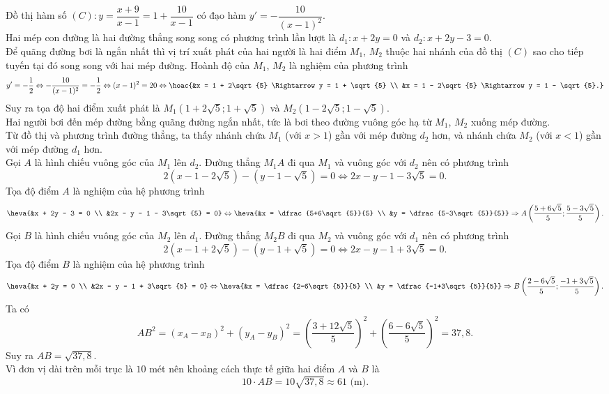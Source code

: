 \begin{ex}
{\begin{center}
\begin{tikzpicture}[>=stealth, line cap=round, line join=round, scale=0.6]
			\end{tikzpicture}
		\end{center}
		Đồ thị hàm số $(C)\colon y = \dfrac{x+9}{x-1} = 1 + \dfrac{10}{x-1}$ có đạo hàm $y' = -\dfrac{10}{(x-1)^2}$.\\
		Hai mép con đường là hai đường thẳng song song có phương trình lần lượt là $d_1\colon x+2y=0$ và $d_2\colon x+2y-3=0$.\\
		Để quãng đường bơi là ngắn nhất thì vị trí xuất phát của hai người là hai điểm $M_1$, $M_2$ thuộc hai nhánh của đồ thị $(C)$ sao cho tiếp tuyến tại đó song song với hai mép đường. Hoành độ của $M_1$, $M_2$ là nghiệm của phương trình
		\[ y' = -\dfrac{1}{2} \Leftrightarrow -\dfrac{10}{(x-1)^2} = -\dfrac{1}{2} \Leftrightarrow (x-1)^2 = 20 \Leftrightarrow \hoac{&x = 1 + 2\sqrt{5} \Rightarrow y = 1 + \sqrt{5} \\ &x = 1 - 2\sqrt{5} \Rightarrow y = 1 - \sqrt{5}.} \]
		Suy ra tọa độ hai điểm xuất phát là $M_1\left(1+2\sqrt{5}; 1+\sqrt{5}\right)$ và $M_2\left(1-2\sqrt{5}; 1-\sqrt{5}\right)$.\\
		Hai người bơi đến mép đường bằng quãng đường ngắn nhất, tức là bơi theo đường vuông góc hạ từ $M_1$, $M_2$ xuống mép đường.\\
		Từ đồ thị và phương trình đường thẳng, ta thấy nhánh chứa $M_1$ (với $x > 1$) gần với mép đường $d_2$ hơn, và nhánh chứa $M_2$ (với $x < 1$) gần với mép đường $d_1$ hơn.\\
		Gọi $A$ là hình chiếu vuông góc của $M_1$ lên $d_2$. Đường thẳng $M_1 A$ đi qua $M_1$ và vuông góc với $d_2$ nên có phương trình
		\[ 2\left(x - 1 - 2\sqrt{5}\right) - \left(y - 1 - \sqrt{5}\right) = 0 \Leftrightarrow 2x - y - 1 - 3\sqrt{5} = 0. \]
		Tọa độ điểm $A$ là nghiệm của hệ phương trình
		\[ \heva{&x + 2y - 3 = 0 \\ &2x - y - 1 - 3\sqrt{5} = 0} \Leftrightarrow \heva{&x = \dfrac{5+6\sqrt{5}}{5} \\ &y = \dfrac{5-3\sqrt{5}}{5}} \Rightarrow A\left(\dfrac{5+6\sqrt{5}}{5}; \dfrac{5-3\sqrt{5}}{5}\right). \]
		Gọi $B$ là hình chiếu vuông góc của $M_2$ lên $d_1$. Đường thẳng $M_2 B$ đi qua $M_2$ và vuông góc với $d_1$ nên có phương trình
		\[ 2\left(x - 1 + 2\sqrt{5}\right) - \left(y - 1 + \sqrt{5}\right) = 0 \Leftrightarrow 2x - y - 1 + 3\sqrt{5} = 0. \]
		Tọa độ điểm $B$ là nghiệm của hệ phương trình
		\[ \heva{&x + 2y = 0 \\ &2x - y - 1 + 3\sqrt{5} = 0} \Leftrightarrow \heva{&x = \dfrac{2-6\sqrt{5}}{5} \\ &y = \dfrac{-1+3\sqrt{5}}{5}} \Rightarrow B\left(\dfrac{2-6\sqrt{5}}{5}; \dfrac{-1+3\sqrt{5}}{5}\right). \]
		Ta có
		\[ AB^2 = \left(x_A - x_B\right)^2 + \left(y_A - y_B\right)^2 = \left(\dfrac{3+12\sqrt{5}}{5}\right)^2 + \left(\dfrac{6-6\sqrt{5}}{5}\right)^2= 37{,}8. \]
		Suy ra $AB = \sqrt{37{,}8}$.\\
		Vì đơn vị dài trên mỗi trục là $10$ mét nên khoảng cách thực tế giữa hai điểm $A$ và $B$ là
		\[ 10 \cdot AB = 10\sqrt{37{,}8} \approx 61 \text{ (m)}. \]
	}
\end{ex}

